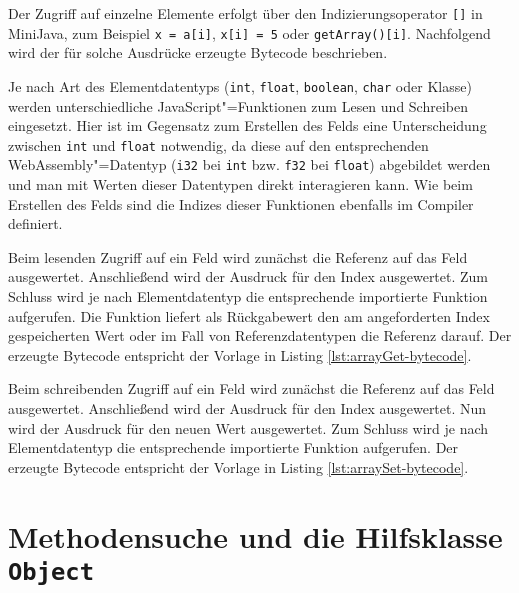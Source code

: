 Der Zugriff auf einzelne Elemente erfolgt über den Indizierungsoperator \lstinline{[]} in MiniJava, zum Beispiel \lstinline{x = a[i]}, \lstinline{x[i] = 5} oder \lstinline{getArray()[i]}. Nachfolgend wird der für solche Ausdrücke erzeugte Bytecode beschrieben.

Je nach Art des Elementdatentyps (\lstinline{int}, \lstinline{float}, \lstinline{boolean}, \lstinline{char} oder Klasse) werden unterschiedliche JavaScript"=Funktionen zum Lesen und Schreiben eingesetzt. Hier ist im Gegensatz zum Erstellen des Felds eine Unterscheidung zwischen \lstinline{int} und \lstinline{float} notwendig, da diese auf den entsprechenden WebAssembly"=Datentyp (\lstinline{i32} bei \lstinline{int} bzw. \lstinline{f32} bei \lstinline{float}) abgebildet werden und man mit Werten dieser Datentypen direkt interagieren kann. Wie beim Erstellen des Felds sind die Indizes dieser Funktionen ebenfalls im Compiler definiert.

Beim lesenden Zugriff auf ein Feld wird zunächst die Referenz auf das Feld ausgewertet. Anschließend wird der Ausdruck für den Index ausgewertet. Zum Schluss wird je nach Elementdatentyp die entsprechende importierte Funktion aufgerufen. Die Funktion liefert als Rückgabewert den am angeforderten Index gespeicherten Wert oder im Fall von Referenzdatentypen die Referenz darauf. Der erzeugte Bytecode entspricht der Vorlage in Listing \ref{lst:arrayGet-bytecode}.



Beim schreibenden Zugriff auf ein Feld wird zunächst die Referenz auf das Feld ausgewertet. Anschließend wird der Ausdruck für den Index ausgewertet. Nun wird der Ausdruck für den neuen Wert ausgewertet. Zum Schluss wird je nach Elementdatentyp die entsprechende importierte Funktion aufgerufen. Der erzeugte Bytecode entspricht der Vorlage in Listing \ref{lst:arraySet-bytecode}.

\pagebreak


\section{Methodensuche und die Hilfsklasse \lstinline{Object}}

